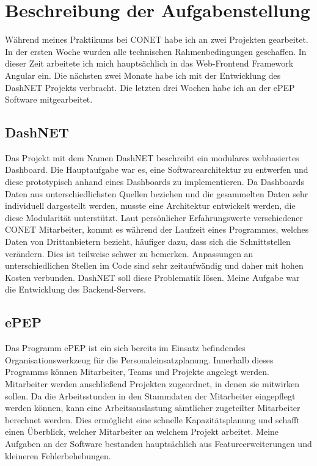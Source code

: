\section{Beschreibung der Aufgabenstellung}
Während meines Praktikums bei CONET habe ich an zwei Projekten gearbeitet. In der ersten Woche wurden alle technischen Rahmenbedingungen geschaffen. In dieser Zeit arbeitete ich mich hauptsächlich in das Web-Frontend Framework Angular ein. Die nächsten zwei Monate habe ich mit der Entwicklung des DashNET Projekts verbracht. Die letzten drei Wochen habe ich an der ePEP Software mitgearbeitet.

\subsection{DashNET}
Das Projekt mit dem Namen DashNET beschreibt ein modulares webbasiertes Dashboard. Die Hauptaufgabe war es, eine Softwarearchitektur zu entwerfen und diese prototypisch anhand eines Dashboards zu implementieren. Da Dashboards Daten aus unterschiedlichsten Quellen beziehen und die gesammelten Daten sehr individuell dargestellt werden, musste eine Architektur entwickelt werden, die diese Modularität unterstützt. Laut persönlicher Erfahrungswerte verschiedener CONET Mitarbeiter, kommt es während der Laufzeit eines Programmes, welches Daten von Drittanbietern bezieht, häufiger dazu, dass sich die Schnittstellen verändern. Dies ist teilweise schwer zu bemerken. Anpassungen an unterschiedlichen Stellen im Code sind sehr zeitaufwändig und daher mit hohen Kosten verbunden. DashNET soll diese Problematik lösen. Meine Aufgabe war die Entwicklung des Backend-Servers. 

\subsection{ePEP}

Das Programm ePEP ist ein sich bereits im Einsatz befindendes Organisationswerkzeug für die Personaleinsatzplanung. Innerhalb dieses Programms können Mitarbeiter, Teams und Projekte angelegt werden. Mitarbeiter werden anschließend Projekten zugeordnet, in denen sie mitwirken sollen. Da die Arbeitsstunden in den Stammdaten der Mitarbeiter eingepflegt werden können, kann eine Arbeitsauslastung sämtlicher zugeteilter Mitarbeiter berechnet werden. Dies ermöglicht eine schnelle Kapazitätsplanung und schafft einen Überblick, welcher Mitarbeiter an welchem Projekt arbeitet. Meine Aufgaben an der Software bestanden hauptsächlich aus Featureerweiterungen und kleineren Fehlerbehebungen. 